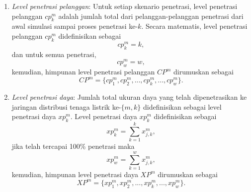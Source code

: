 \begin{enumerate}
    \item \textit{Level penetrasi pelanggan}:
    Untuk setiap skenario penetrasi, level penetrasi pelanggan $cp^m_k$ adalah jumlah total dari pelanggan-pelanggan penetrasi dari awal simulasi sampai proses penetrasi ke-$k$. Secara matematis, level penetrasi pelanggan $cp^m_k$ didefinisikan sebagai
    \begin{equation}\label{cpl1}
    cp^m_k=k,
    \end{equation}
    dan untuk semua penetrasi,
    \begin{equation}\label{cpl2}
    cp^m_w=w,
    \end{equation}
    kemudian, himpunan level penetrasi pelanggan $\mathit{CP^m}$ dirumuskan sebagai
    \begin{equation}\label{cpl3}
    \mathit{CP^m}=\{cp^m_1,cp^m_2,...,cp^m_k,...,cp^m_w\}.
    \end{equation}
    \item \textit{Level penetrasi daya}:
    Jumlah total ukuran daya yang telah dipenetrasikan ke jaringan distribusi tenaga listrik ke-$\{m,k\}$ didefinisikan sebagai level penetrasi daya $xp^m_k$. Level penetrasi daya $xp^m_k$ didefinisikan sebagai
    \begin{equation}\label{xpl1}
    xp^m_k=\sum_{k=1}^k x^m_{j,k},
    \end{equation}
    jika telah tercapai 100\% penetrasi maka
    \begin{equation}\label{xpl2}
    \mathit{xp^m_w}=\sum_{k=1}^w x^m_{j,k},
    \end{equation}
    kemudian, himpunan level penetrasi daya $\mathit{XP^m}$ dirumuskan sebagai
    \begin{equation}\label{xpl3}
    \mathit{XP^m}=\{xp^m_1,xp^m_2,...,xp^m_k,...,xp^m_w\}.
    \end{equation}
    

\end{enumerate}
